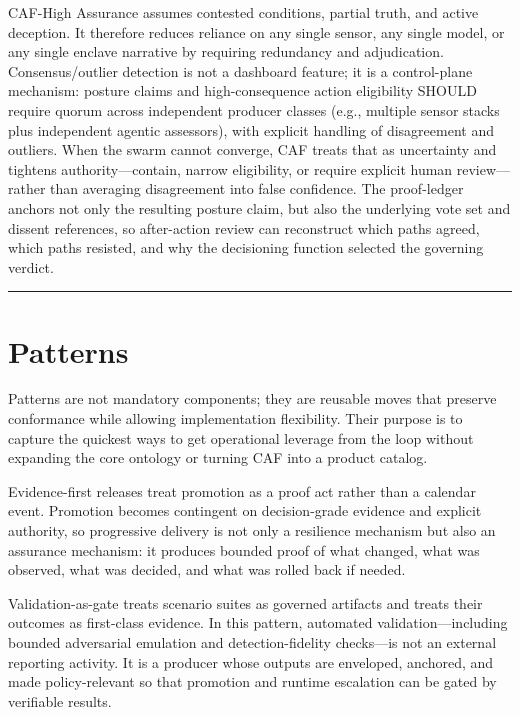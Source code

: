 \documentclass[11pt]{article}
\begin{document}
CAF-High Assurance assumes contested conditions, partial truth, and active deception. It therefore reduces reliance on any single sensor, any single model, or any single enclave narrative by requiring redundancy and adjudication. Consensus/outlier detection is not a dashboard feature; it is a control-plane mechanism: posture claims and high-consequence action eligibility SHOULD require quorum across independent producer classes (e.g., multiple sensor stacks plus independent agentic assessors), with explicit handling of disagreement and outliers. When the swarm cannot converge, CAF treats that as uncertainty and tightens authority---contain, narrow eligibility, or require explicit human review---rather than averaging disagreement into false confidence. The proof-ledger anchors not only the resulting posture claim, but also the underlying vote set and dissent references, so after-action review can reconstruct which paths agreed, which paths resisted, and why the decisioning function selected the governing verdict.

\begin{center}\rule{0.5\linewidth}{0.5pt}\end{center}

\hypertarget{patterns}{%
\section{Patterns}\label{patterns}}

Patterns are not mandatory components; they are reusable moves that preserve conformance while allowing implementation flexibility. Their purpose is to capture the quickest ways to get operational leverage from the loop without expanding the core ontology or turning CAF into a product catalog.

Evidence-first releases treat promotion as a proof act rather than a calendar event. Promotion becomes contingent on decision-grade evidence and explicit authority, so progressive delivery is not only a resilience mechanism but also an assurance mechanism: it produces bounded proof of what changed, what was observed, what was decided, and what was rolled back if needed.

Validation-as-gate treats scenario suites as governed artifacts and treats their outcomes as first-class evidence. In this pattern, automated validation---including bounded adversarial emulation and detection-fidelity checks---is not an external reporting activity. It is a producer whose outputs are enveloped, anchored, and made policy-relevant so that promotion and runtime escalation can be gated by verifiable results.
\end{document}
